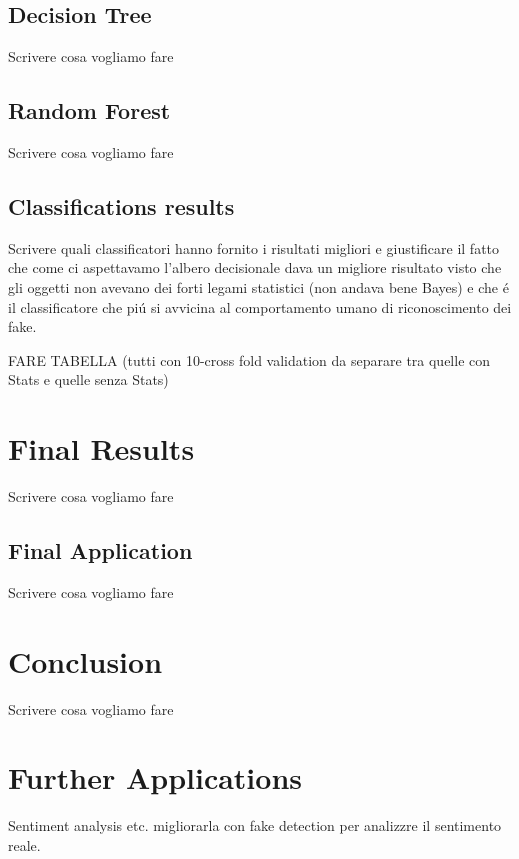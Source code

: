 \documentclass{article}
\begin{document}
\subsection{Decision Tree}
Scrivere cosa vogliamo fare

\subsection{Random Forest}
Scrivere cosa vogliamo fare

\subsection{Classifications results}
Scrivere quali classificatori hanno fornito i risultati migliori e giustificare il fatto che come ci aspettavamo l'albero decisionale dava un migliore risultato visto che gli oggetti non avevano dei forti legami statistici (non andava bene Bayes) e che é il classificatore che piú si avvicina al comportamento umano di riconoscimento dei fake.

FARE TABELLA (tutti con 10-cross fold validation da separare tra quelle con Stats e quelle senza Stats)

\section{Final Results}
Scrivere cosa vogliamo fare

\subsection{Final Application}
Scrivere cosa vogliamo fare

\section{Conclusion}
Scrivere cosa vogliamo fare

\section{Further Applications}
Sentiment analysis etc. migliorarla con fake detection per analizzre il sentimento reale.
\end{document}
